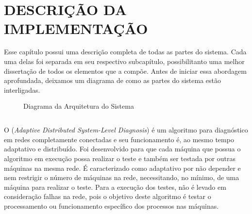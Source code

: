 
\chapter{DESCRIÇÃO DA IMPLEMENTAÇÃO}
\label{chap:descricao_da_implementacao}

Esse capítulo possui uma descrição completa de todas as partes do sistema. Cada uma delas foi separada em seu respectivo subcapítulo, possibilitanto uma melhor dissertação de todos os elementos que a compõe. Antes de iniciar essa abordagem aprofundada, deixamos um diagrama de como as partes do sistema estão interligadas.

\begin{figure}[!htb]
    \centering
    \caption{Diagrama da Arquitetura do Sistema}
    \label{fig:diagrama_arquitetura}
\end{figure}

\section{\adaptive{}}
\label{sec:adaptiveDSD}

O \adaptive (\textit{Adaptive Distributed System-Level Diagnosis}) é um algoritmo para diagnóstico em redes completamente conectadas e seu funcionamento é, ao mesmo tempo 
adaptativo e distribuído. Foi desenvolvido para que cada máquina que possua o algoritmo em execução possa realizar o teste e também ser testada por outras máquinas na mesma rede.
É caracterizado como adaptativo por não depender e nem restrigir o número de máquinas na rede, necessitando, no mínimo, de uma máquina para realizar o teste. Para a execução dos testes, não é levado
em consideração falhas na rede, pois o objetivo deste algoritmo é testar o processamento ou funcionamento específico dos processos nas máquinas.

